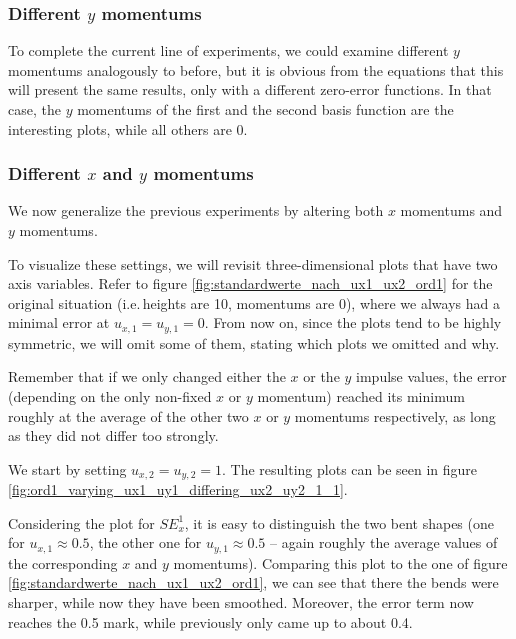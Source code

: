 \documentclass{article}
\begin{document}
\subsubsection{\texorpdfstring{Different $y$ momentums}{Different y momentums}}
\label{sec:stiffness-analysis-ord1-nonstandard-diff-uy}

To complete the current line of experiments, we could examine different $y$ momentums analogously to before, but it is obvious from the equations that this will present the same results, only with a different zero-error functions. In that case, the $y$ momentums of the first and the second basis function are the interesting plots, while all others are 0.

\subsubsection{\texorpdfstring{Different $x$ and $y$ momentums}{Different x and y momentums}}
\label{sec:stiffness-analysis-different-ux-uy-momentums}

We now generalize the previous experiments by altering both $x$ momentums and $y$ momentums.



To visualize these settings, we will revisit three-dimensional plots that have two axis variables. Refer to figure \ref{fig:standardwerte_nach_ux1_ux2_ord1} for the original situation (i.e.\,heights are 10, momentums are 0), where we always had a minimal error at $u_{x,1}=u_{y,1}=0$. From now on, since the plots tend to be highly symmetric, we will omit some of them, stating which plots we omitted and why.

Remember that if we only changed either the $x$ or the $y$ impulse values, the error (depending on the only non-fixed $x$ or $y$ momentum) reached its minimum roughly at the average of the other two $x$ or $y$ momentums respectively, as long as they did not differ too strongly.

We start by setting $u_{x,2}=u_{y,2}=1$. The resulting plots can be seen in figure \ref{fig:ord1_varying_ux1_uy1_differing_ux2_uy2_1_1}.

Considering the plot for $SE_x^1$, it is easy to distinguish the two bent shapes (one for $u_{x,1}\approx 0.5$, the other one for $u_{y,1}\approx 0.5$ -- again roughly the average values of the corresponding $x$ and $y$ momentums). Comparing this plot to the one of figure \ref{fig:standardwerte_nach_ux1_ux2_ord1}, we can see that there the bends were sharper, while now they have been smoothed. Moreover, the error term now reaches the 0.5 mark, while previously only came up to about 0.4.
\end{document}
